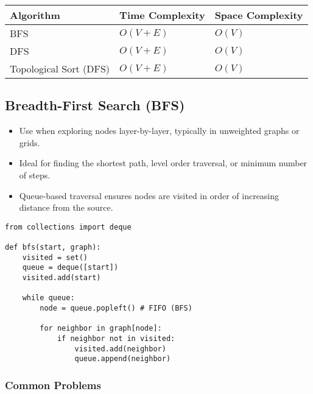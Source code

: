 \begin{summary}
    \begin{center}
        \begin{tabular}{lll}
            \toprule
            \textbf{Algorithm} & \textbf{Time Complexity} & \textbf{Space Complexity} \\
            \midrule
            BFS & $O(V + E)$ & $O(V)$ \\
            \midrule
            DFS & $O(V + E)$ & $O(V)$ \\
            \midrule
            Topological Sort (DFS) & $O(V + E)$ & $O(V)$ \\
        \end{tabular}
    \end{center}
\end{summary}

\subsection{Breadth-First Search (BFS)}
\begin{summary}
    \begin{itemize}
        \item Use when exploring nodes layer-by-layer, typically in unweighted graphs or grids.
        \item Ideal for finding the shortest path, level order traversal, or minimum number of steps.
        \item Queue-based traversal ensures nodes are visited in order of increasing distance from the source.
    \end{itemize}
\end{summary}

\begin{algo}
\begin{lstlisting}
from collections import deque

def bfs(start, graph):
    visited = set()
    queue = deque([start])
    visited.add(start)

    while queue:
        node = queue.popleft() # FIFO (BFS)

        for neighbor in graph[node]:
            if neighbor not in visited:
                visited.add(neighbor)
                queue.append(neighbor)
\end{lstlisting}
\end{algo}
\newpage

\subsubsection{Common Problems}
\begin{summary}
\end{summary}
\newpage

